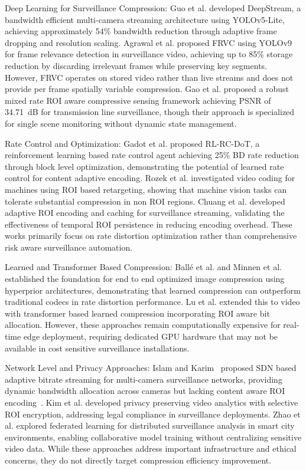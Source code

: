 \documentclass[11pt,a4paper]{article}
\begin{document}
Deep Learning for Surveillance Compression: Guo et al.\cite{guo2023deepstream} developed DeepStream, a bandwidth efficient multi-camera streaming architecture using YOLOv5-Lite, achieving approximately 54\% bandwidth reduction through adaptive frame dropping and resolution scaling. Agrawal et al.\cite{agrawal2025frvc} proposed FRVC using YOLOv9 for frame relevance detection in surveillance video, achieving up to 85\% storage reduction by discarding irrelevant frames while preserving key segments. However, FRVC operates on stored video rather than live streams and does not provide per frame spatially variable compression. Gao et al.\cite{gao2024robust} proposed a robust mixed rate ROI aware compressive sensing framework achieving PSNR of 34.71~dB for transmission line surveillance, though their approach is specialized for single scene monitoring without dynamic state management.

Rate Control and Optimization: Gadot et al.\cite{gadot2025rlrc} proposed RL-RC-DoT, a reinforcement learning based rate control agent achieving 25\% BD rate reduction through block level optimization, demonstrating the potential of learned rate control for content adaptive encoding. Rozek et al.\cite{rozek2025video} investigated video coding for machines using ROI based retargeting, showing that machine vision tasks can tolerate substantial compression in non ROI regions. Chuang et al.\cite{chuang2025adaptive} developed adaptive ROI encoding and caching for surveillance streaming, validating the effectiveness of temporal ROI persistence in reducing encoding overhead. These works primarily focus on rate distortion optimization rather than comprehensive risk aware surveillance automation.

Learned and Transformer Based Compression: Ball\'e et al.\cite{balle2017end} and Minnen et al.\cite{minnen2018joint} established the foundation for end to end optimized image compression using hyperprior architectures, demonstrating that learned compression can outperform traditional codecs in rate distortion performance. Lu et al.\cite{lu2024transformer} extended this to video with transformer based learned compression incorporating ROI aware bit allocation. However, these approaches remain computationally expensive for real-time edge deployment, requiring dedicated GPU hardware that may not be available in cost sensitive surveillance installations.

Network Level and Privacy Approaches: Islam and Karim~\cite{islam2024sdn} proposed SDN based adaptive bitrate streaming for multi-camera surveillance networks, providing dynamic bandwidth allocation across cameras but lacking content aware ROI encoding~\cite{islam2024sdn}. Kim et al.\cite{kim2024privacy} developed privacy preserving video analytics with selective ROI encryption, addressing legal compliance in surveillance deployments. Zhao et al.\cite{zhao2025federated} explored federated learning for distributed surveillance analysis in smart city environments, enabling collaborative model training without centralizing sensitive video data. While these approaches address important infrastructure and ethical concerns, they do not directly target compression efficiency improvement.
\end{document}
